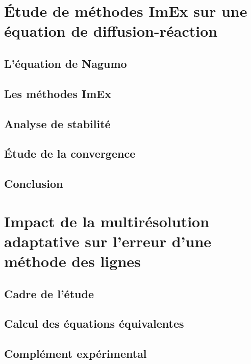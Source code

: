 \documentclass[11pt]{report}
\theoremstyle{definition}
\theoremstyle{remark}
\begin{document}
    \section{Étude de méthodes ImEx sur une équation de diffusion-réaction}
        
        \newpage
        \subsection{L'équation de Nagumo}
        \newpage
        \subsection{Les méthodes ImEx}
        \newpage
        \subsection{Analyse de stabilité}
        \subsection{Étude de la convergence}
        \subsection{Conclusion}
    \newpage
    \section{Impact de la multirésolution adaptative sur l'erreur d'une méthode des lignes}
        
        \subsection{Cadre de l'étude}                   
        \subsection{Calcul des équations équivalentes}  
        \subsection{Complément expérimental}            
\end{document}
